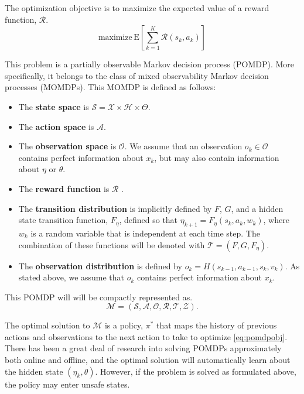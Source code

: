 \documentclass{article}
\newcommand{\sspace}{\ensuremath{\mathcal{S}} }
\newcommand{\aspace}{\ensuremath{\mathcal{A}} }
\newcommand{\ospace}{\ensuremath{\mathcal{O}} }
\newcommand{\tdist}{\ensuremath{\mathcal{T}} }
\newcommand{\odist}{\ensuremath{\mathcal{Z}} }
\newcommand{\reward}{\ensuremath{\mathcal{R}} }
\newcommand{\hstate}{\eta}
\newcommand{\hsspace}{\mathcal{H}}
\newcommand{\dstate}{\theta}
\newcommand{\dsspace}{\Theta}
\begin{document}
The optimization objective is to maximize the expected value of a reward function, $\reward$.
\begin{equation}
    \text{maximize}\, \text{E} \left[ \sum_{k=1}^K \reward(s_k, a_k) \right]
    \label{eq:pomdpobj}
\end{equation}

This problem is a partially observable Markov decision process (POMDP).
More specifically, it belongs to the class of mixed observability Markov decision processes (MOMDPs).
This MOMDP is defined as follows:

\begin{itemize}
    \item The \textbf{state space} is $\sspace = \mathcal{X} \times \hsspace \times \dsspace$.
    \item The \textbf{action space} is $\aspace$.
    \item The \textbf{observation space} is $\ospace$. We assume that an observation $o_k \in \ospace$ contains perfect information about $x_k$, but may also contain information about $\hstate$ or $\dstate$.
    \item The \textbf{reward function} is \reward.
    \item The \textbf{transition distribution} is implicitly defined by $F$, $G$, and a hidden state transition function, $F_\hstate$, defined so that $\hstate_{k+1} = F_\hstate(s_k, a_k, w_k)$, where $w_k$ is a random variable that is independent at each time step. The combination of these functions will be denoted with $\tdist = (F, G, F_\hstate)$.
    \item The \textbf{observation distribution} is defined by $o_k = H(s_{k-1}, a_{k-1}, s_k, v_k)$. As stated above, we assume that $o_k$ contains perfect information about $x_k$.
\end{itemize}

This POMDP will will be compactly represented as.
\begin{equation}
    \mathcal{M} = (\sspace, \aspace, \ospace, \reward, \tdist, \odist) \text{.}
\end{equation}

The optimal solution to $\mathcal{M}$ is a policy, $\pi^*$ that maps the history of previous actions and observations to the next action to take to optimize \cref{eq:pomdpobj}.
There has been a great deal of research into solving POMDPs approximately both online and offline, and the optimal solution will automatically learn about the hidden state $(\hstate_k, \dstate)$. However, if the problem is solved as formulated above, the policy may enter unsafe states.
\end{document}
